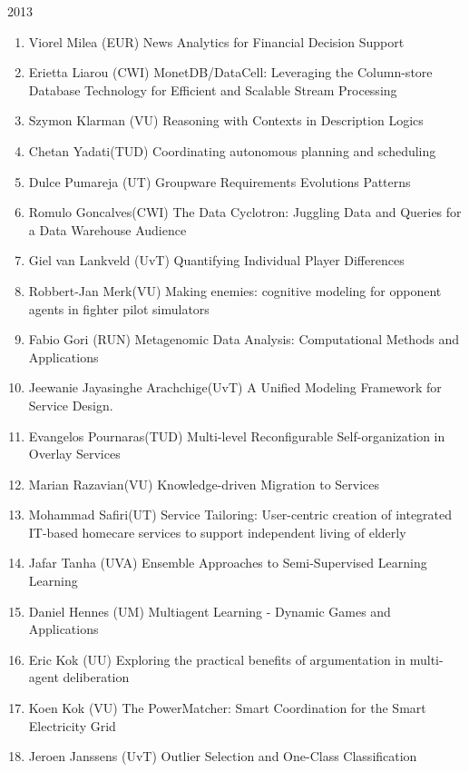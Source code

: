 \begin{multicols}{2}
\begin{scriptsize}
\vspace{0.2cm}
2013
\vspace{0.2cm}
\begin{enumerate}[leftmargin=*,noitemsep,topsep=0pt,parsep=1pt,partopsep=0pt]
\renewcommand{\labelenumi}{2013-\arabic{enumi}}
\item Viorel Milea (EUR) News Analytics for Financial Decision Support
\item Erietta Liarou (CWI) MonetDB/DataCell: Leveraging the Column-store Database Technology for Efficient and Scalable Stream Processing
\item Szymon Klarman (VU) Reasoning with Contexts in Description Logics
\item Chetan Yadati(TUD) Coordinating autonomous planning and scheduling 
\item Dulce Pumareja (UT) Groupware Requirements Evolutions Patterns 
\item Romulo Goncalves(CWI) The Data Cyclotron: Juggling Data and Queries for a Data Warehouse Audience
\item Giel van Lankveld (UvT) Quantifying Individual Player Differences 
\item Robbert-Jan Merk(VU) Making enemies: cognitive modeling for opponent agents in fighter pilot simulators
\item Fabio Gori (RUN) Metagenomic Data Analysis: Computational Methods and Applications
\item Jeewanie Jayasinghe Arachchige(UvT) A Unified Modeling Framework for Service Design.
\item Evangelos Pournaras(TUD) Multi-level Reconfigurable Self-organization in Overlay Services
\item Marian Razavian(VU) Knowledge-driven Migration to Services
\item Mohammad Safiri(UT) Service Tailoring: User-centric creation of integrated IT-based homecare services to support independent living of elderly
\item Jafar Tanha (UVA) Ensemble Approaches to Semi-Supervised Learning Learning
\item Daniel Hennes (UM) Multiagent Learning - Dynamic Games and Applications
\item Eric Kok (UU) Exploring the practical benefits of argumentation in multi-agent deliberation
\item Koen Kok (VU) The PowerMatcher: Smart Coordination for the Smart Electricity Grid
\item Jeroen Janssens (UvT) Outlier Selection and One-Class Classification

\end{enumerate}
\end{scriptsize}
\end{multicols}
